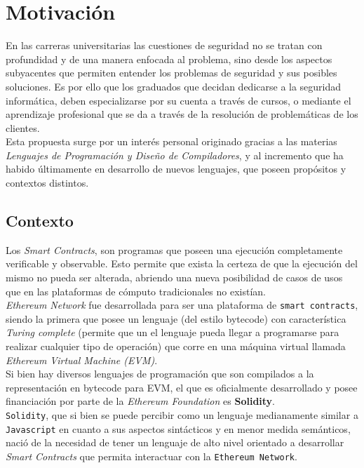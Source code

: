 \section{Motivación}
En las carreras universitarias las cuestiones de seguridad no se tratan con profundidad y de una manera enfocada al problema, sino desde los aspectos subyacentes que permiten entender los problemas de seguridad y sus posibles soluciones.  Es por ello que los graduados que decidan dedicarse a la seguridad informática, deben especializarse por su cuenta a través de cursos, o mediante el aprendizaje profesional que se da a través de la resolución de problemáticas de los clientes.\\

Esta propuesta surge por un interés personal originado gracias a las materias \textit{Lenguajes de Programación y Diseño de Compiladores}, y al incremento que ha habido últimamente en desarrollo de nuevos lenguajes, que poseen propósitos y contextos distintos\cite{Klabnik:2018:RPL:3271463}\cite{Forsgren:2018:ASL:3235404}.

\subsection{Contexto}
Los \textit{Smart Contracts}, son programas que poseen una ejecución completamente verificable y observable. Esto permite que exista la certeza de que la ejecución del mismo no pueda ser alterada, abriendo una nueva posibilidad de casos de usos que en las plataformas de cómputo tradicionales no existían.\\

\textit{Ethereum Network} fue desarrollada para ser una plataforma de \texttt{smart contracts}, siendo la primera que posee un lenguaje (del estilo bytecode) con característica \textit{Turing complete} (permite que un el lenguaje pueda llegar a programarse para realizar cualquier tipo de operación) que corre en una máquina virtual llamada \textit{Ethereum Virtual Machine (EVM)}.\\

Si bien hay diversos lenguajes de programación que son compilados a la representación en bytecode para EVM, el que es oficialmente desarrollado y posee financiación por parte de la \textit{Ethereum Foundation} es \textbf{Solidity}\cite{solidity_readthedocs}.\\

\texttt{Solidity}, que si bien se puede percibir como un lenguaje medianamente similar a \texttt{Javascript} en cuanto a sus aspectos sintácticos y en menor medida semánticos, nació de la necesidad de tener un lenguaje de alto nivel orientado a desarrollar \textit{Smart Contracts} que permita interactuar con la \texttt{Ethereum Network}. \\

